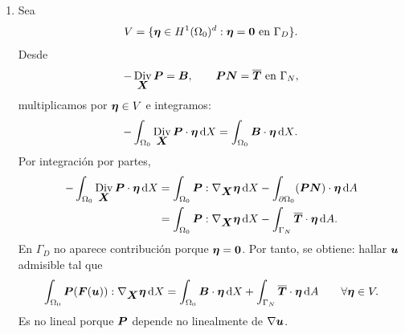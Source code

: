 \documentclass[11pt]{article}
\def\vec   #1{\mbox{\boldmath $#1$}{}}
\def\ten   #1{\mbox{\boldmath $#1$}{}}
\def\dX{\mbox{\(\,\mathrm{d}X\)}}
\def\dA{\mbox{\(\,\mathrm{d}A\)}}
\DeclareMathOperator{\Div}{Div}
\begin{document}
\begin{enumerate}[label=\textbf{\arabic*.}, leftmargin=*]
\begin{enumerate}[label=(\alph*)]
        \item Sea
        \[
            V=\{\vec\eta\in H^1(\Omega_0)^d:\vec\eta=\vec0\text{ en }\Gamma_D\}.
        \]
        Desde
        \[
            -\Div_{\vec X}\ten P=\vec B,
            \qquad
            \ten P\vec N=\overline{\vec T}\text{ en }\Gamma_N,
        \]
        multiplicamos por $\vec\eta\in V$ e integramos:
        \[
            -\int_{\Omega_0}\Div_{\vec X}\ten P\cdot\vec\eta\dX
            =
            \int_{\Omega_0}\vec B\cdot\vec\eta\dX.
        \]
        Por integración por partes,
        \[
        \begin{aligned}
            -\int_{\Omega_0}\Div_{\vec X}\ten P\cdot\vec\eta\dX
            &=
            \int_{\Omega_0}\ten P:\nabla_{\vec X}\vec\eta\dX
            -\int_{\partial\Omega_0}(\ten P\vec N)\cdot\vec\eta\dA\\
            &=
            \int_{\Omega_0}\ten P:\nabla_{\vec X}\vec\eta\dX
            -\int_{\Gamma_N}\overline{\vec T}\cdot\vec\eta\dA.
        \end{aligned}
        \]
        En $\Gamma_D$ no aparece contribución porque $\vec\eta=\vec0$. Por tanto, se obtiene: hallar $\vec u$ admisible tal que
        \[
            \int_{\Omega_0}\ten P(\ten F(\vec u)):\nabla_{\vec X}\vec\eta\dX
            =
            \int_{\Omega_0}\vec B\cdot\vec\eta\dX
            +\int_{\Gamma_N}\overline{\vec T}\cdot\vec\eta\dA
            \qquad\forall\vec\eta\in V.
        \]
        Es no lineal porque $\ten P$ depende no linealmente de $\nabla\vec u$.


\end{enumerate}
\end{enumerate}
\end{document}
